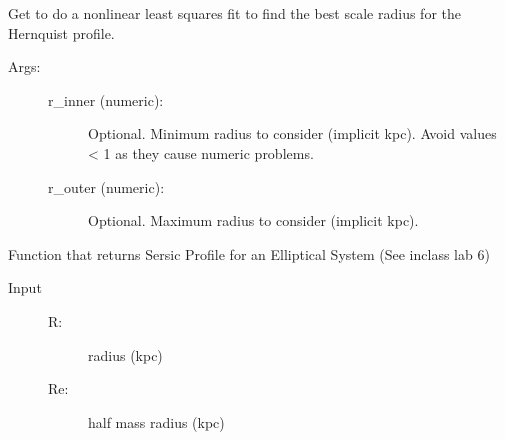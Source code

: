\documentclass[letterpaper,10pt,english]{sphinxmanual}
\begin{document}
\begin{fulllineitems}
\begin{fulllineitems}
\begin{description}
\end{description}

\end{fulllineitems}


\begin{fulllineitems}
\label{\detokenize{remnant:galaxy.remnant.Remnant.fit_hernquist_a}}
Get  to do a non\sphinxhyphen{}linear least squares fit to find
the best scale radius  for the Hernquist profile.
\begin{description}
\item[{Args:}] \leavevmode\begin{description}
\item[{r\_inner (numeric):}] \leavevmode
Optional. Minimum radius to consider (implicit kpc). 
Avoid values \textless{} 1 as they cause numeric problems.

\item[{r\_outer (numeric):}] \leavevmode
Optional. Maximum radius to consider (implicit kpc).

\end{description}

\end{description}

\end{fulllineitems}


\begin{fulllineitems}
\label{\detokenize{remnant:galaxy.remnant.Remnant.sersic}}
Function that returns Sersic Profile for an Elliptical System
(See in\sphinxhyphen{}class lab 6)
\begin{description}
\item[{Input}] \leavevmode\begin{description}
\item[{R:}] \leavevmode
radius (kpc)

\item[{Re:}] \leavevmode
half mass radius (kpc)


\end{description}
\end{description}
\end{fulllineitems}
\end{fulllineitems}
\end{document}
